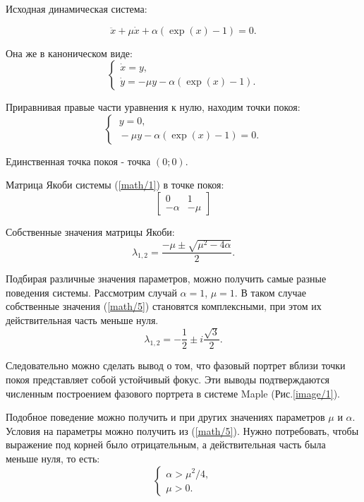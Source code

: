 \documentclass[10pt,a4paper]{article}
\begin{document}
	Исходная динамическая система:
	
	\begin{equation}
		\label{math/1}
		\ddot{x} + \mu \dot{x} + \alpha (\exp(x) - 1) = 0.	
	\end{equation}
	
	Она же в каноническом виде:
	\begin{equation}
		\label{math/2}
		\begin{cases}
			\dot{x} = y, \\
			\dot{y} = -\mu y - \alpha (\exp(x) - 1).
		\end{cases}
	\end{equation}

	Приравнивая правые части уравнения к нулю, находим точки покоя:
	\begin{equation}
		\label{math/3}
		\begin{cases}
			\ y = 0, \\
			\ -\mu y - \alpha (\exp(x) - 1) = 0.
		\end{cases}
	\end{equation}
	
	Единственная точка покоя - точка $(0;0)$.
	
	Матрица Якоби системы (\ref{math/1}) в точке покоя:
	\begin{equation}
		\label{math/4}
		\begin{bmatrix}
			0& 1\\
			-\alpha& -\mu
		\end{bmatrix}
	\end{equation}
	
	Собственные значения матрицы Якоби:
	\begin{equation}
		\label{math/5}
		\lambda_{1,2} = \frac{-\mu \pm \sqrt{\mu^{2} - 4\alpha}}{2}.
	\end{equation}
	
	Подбирая различные значения параметров, можно получить самые разные поведения системы. Рассмотрим случай $\alpha = 1$, $\mu = 1$. В таком случае собственные значения (\ref{math/5}) становятся комплексными, при этом их действительная часть меньше нуля.
	\begin{equation}
		\label{math/6}
		\lambda_{1,2} = -\frac{1}{2} \pm i \frac{\sqrt{3}}{2}.
	\end{equation}
	
	Следовательно можно сделать вывод о том, что фазовый портрет вблизи точки покоя представляет собой устойчивый фокус. Эти выводы подтверждаются численным построением фазового портрета в системе Maple (Рис.\ref{image/1}).
	
	Подобное поведение можно получить и при других значениях параметров $\mu$ и $\alpha$. Условия на параметры можно получить из (\ref{math/5}). Нужно потребовать, чтобы выражение под корней было отрицательным, а действительная часть была меньше нуля, то есть:
	\begin{equation}
		\label{math/7}
		\begin{cases}
			\alpha > \mu^2/4,  \\
			\mu > 0.
		\end{cases}
	\end{equation}
	
	
\end{document}
